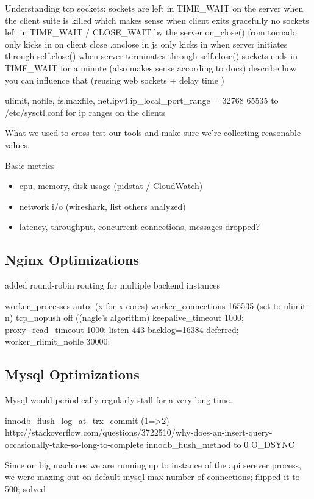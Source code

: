 \documentclass{uvamscse}
\begin{document}
Understanding tcp sockets:
sockets are left in TIME\_WAIT on the server when the client suite is killed which makes sense
when client exits gracefully no sockets left in TIME\_WAIT / CLOSE\_WAIT by the server
on\_close() from tornado only kicks in on client close
.onclose in js only kicks in when server initiates through self.close()
when server terminates through self.close() sockets ends in TIME\_WAIT for a minute (also makes sense according to docs)
describe how you can influence that (reusing web sockets + delay time )

ulimit, nofile, fs.max\-file, net.ipv4.ip\_local\_port\_range = 32768 65535  to /etc/sysctl.conf for ip ranges on the clients

What we used to cross-test our tools and make sure we're collecting reasonable values.

Basic metrics
\begin{itemize}
  \item cpu, memory, disk usage (pidstat / CloudWatch)
  \item network i/o (wireshark, list others analyzed)
  \item latency, throughput, concurrent connections, messages dropped?
\end{itemize}

\subsection{Nginx Optimizations}
added round-robin routing for multiple backend instances

worker\_processes auto; (x for x cores)
worker\_connections 165535 (set to ulimit-n)
tcp\_nopush off ((nagle’s algorithm)
keepalive\_timeout 1000;
proxy\_read\_timeout 1000;
listen 443 backlog=16384 deferred;
worker\_rlimit\_nofile 30000;

\subsection{Mysql Optimizations}
Mysql would periodically regularly stall for a very long time.

innodb\_flush\_log\_at\_trx\_commit (1=>2)
http://stackoverflow.com/questions/3722510/why-does-an-insert-query-occasionally-take-so-long-to-complete
innodb\_flush\_method to 0 O\_DSYNC

Since on big machines we are running up to instance of the api serever process, we were maxing out on default mysql max number of connections; flipped it to 500; solved
\end{document}
